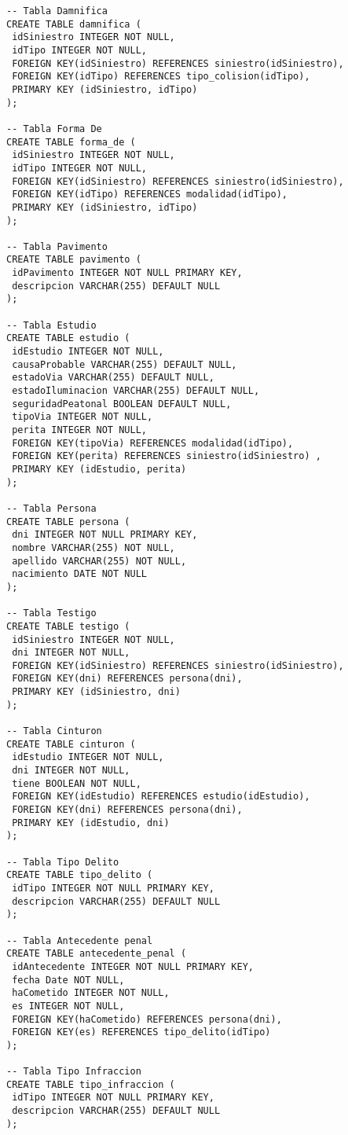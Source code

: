 \begin{verbatim}
-- Tabla Damnifica
CREATE TABLE damnifica (
 idSiniestro INTEGER NOT NULL,
 idTipo INTEGER NOT NULL,
 FOREIGN KEY(idSiniestro) REFERENCES siniestro(idSiniestro),
 FOREIGN KEY(idTipo) REFERENCES tipo_colision(idTipo),
 PRIMARY KEY (idSiniestro, idTipo)
);

-- Tabla Forma De
CREATE TABLE forma_de (
 idSiniestro INTEGER NOT NULL,
 idTipo INTEGER NOT NULL,
 FOREIGN KEY(idSiniestro) REFERENCES siniestro(idSiniestro),
 FOREIGN KEY(idTipo) REFERENCES modalidad(idTipo),
 PRIMARY KEY (idSiniestro, idTipo)
);

-- Tabla Pavimento
CREATE TABLE pavimento (
 idPavimento INTEGER NOT NULL PRIMARY KEY,
 descripcion VARCHAR(255) DEFAULT NULL
);

-- Tabla Estudio
CREATE TABLE estudio (
 idEstudio INTEGER NOT NULL,
 causaProbable VARCHAR(255) DEFAULT NULL,
 estadoVia VARCHAR(255) DEFAULT NULL,
 estadoIluminacion VARCHAR(255) DEFAULT NULL,
 seguridadPeatonal BOOLEAN DEFAULT NULL,
 tipoVia INTEGER NOT NULL,
 perita INTEGER NOT NULL,
 FOREIGN KEY(tipoVia) REFERENCES modalidad(idTipo),
 FOREIGN KEY(perita) REFERENCES siniestro(idSiniestro) ,
 PRIMARY KEY (idEstudio, perita)
);

-- Tabla Persona
CREATE TABLE persona (
 dni INTEGER NOT NULL PRIMARY KEY,
 nombre VARCHAR(255) NOT NULL,
 apellido VARCHAR(255) NOT NULL,
 nacimiento DATE NOT NULL
);

-- Tabla Testigo
CREATE TABLE testigo (
 idSiniestro INTEGER NOT NULL,
 dni INTEGER NOT NULL,
 FOREIGN KEY(idSiniestro) REFERENCES siniestro(idSiniestro),
 FOREIGN KEY(dni) REFERENCES persona(dni),
 PRIMARY KEY (idSiniestro, dni)
);

-- Tabla Cinturon
CREATE TABLE cinturon (
 idEstudio INTEGER NOT NULL,
 dni INTEGER NOT NULL,
 tiene BOOLEAN NOT NULL,
 FOREIGN KEY(idEstudio) REFERENCES estudio(idEstudio),
 FOREIGN KEY(dni) REFERENCES persona(dni),
 PRIMARY KEY (idEstudio, dni)
);

-- Tabla Tipo Delito
CREATE TABLE tipo_delito (
 idTipo INTEGER NOT NULL PRIMARY KEY,
 descripcion VARCHAR(255) DEFAULT NULL
);

-- Tabla Antecedente penal
CREATE TABLE antecedente_penal (
 idAntecedente INTEGER NOT NULL PRIMARY KEY,
 fecha Date NOT NULL,
 haCometido INTEGER NOT NULL,
 es INTEGER NOT NULL,
 FOREIGN KEY(haCometido) REFERENCES persona(dni),
 FOREIGN KEY(es) REFERENCES tipo_delito(idTipo)
);

-- Tabla Tipo Infraccion
CREATE TABLE tipo_infraccion (
 idTipo INTEGER NOT NULL PRIMARY KEY,
 descripcion VARCHAR(255) DEFAULT NULL
);


\end{verbatim}
